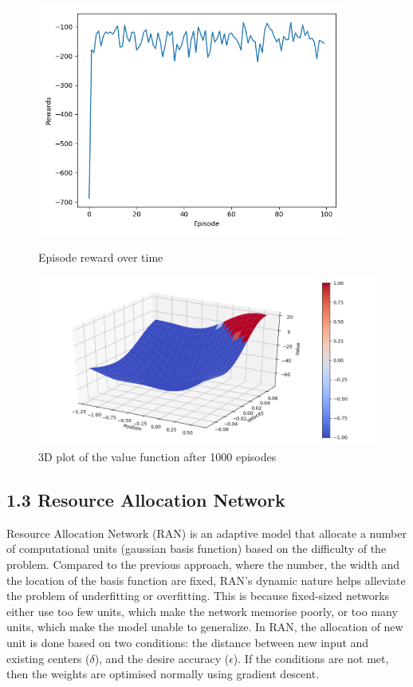 \documentclass[12pt,letterpaper]{article}
\begin{document}
\begin{figure}[h]
  \centering
  \begin{minipage}{0.45\textwidth}
      \centering
      \includegraphics[width=0.9\textwidth]{q-online.png} %
      \caption{Episode reward over time}
      \label{episode-reward}
  \end{minipage}\hfill
  \begin{minipage}{0.55\textwidth}
      \centering
      \includegraphics[width=1\textwidth]{mountain-value.png} %
      \caption{3D plot of the value function after 1000 episodes}
      \label{value-plot}
  \end{minipage}
\end{figure}

\subsection*{1.3 Resource Allocation Network}

Resource Allocation Network (RAN) is an adaptive model that allocate a number of computational units (gaussian basis function) based on the difficulty of the problem.
Compared to the previous approach, where the number, the width and the location of the basis function are fixed, 
RAN's dynamic nature helps alleviate the problem of underfitting or overfitting. 
This is because fixed-sized networks either use too few units, which make the network memorise poorly, 
or too many units, which make the model unable to generalize. 
In RAN, the allocation of new unit is done based on two conditions: the distance between new input and existing centers ($\delta$), 
and the desire accuracy ($\epsilon$).
If the conditions are not met, then the weights are optimised normally using gradient descent.
\end{document}
